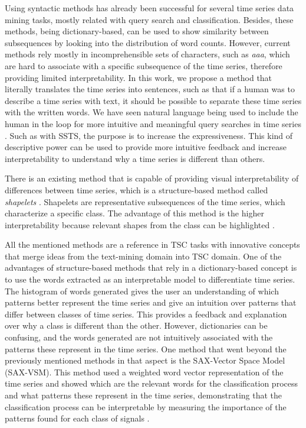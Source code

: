 Using syntactic methods has already been successful for several time series data mining tasks, mostly related with query search and classification. Besides, these methods, being dictionary-based, can be used to show similarity between subsequences by looking into the distribution of word counts. However, current methods rely mostly in incomprehensible sets of characters, such as \textit{aaa}, which are hard to associate with a specific subsequence of the time series, therefore providing limited interpretability. In this work, we propose a method that literally translates the time series into sentences, such as that if a human was to describe a time series with text, it should be possible to separate these time series with the written words. We have seen natural language being used to include the human in the loop for more intuitive and meaningful query searches in time series \cite{hil_naturallanguage}. Such as with SSTS, the purpose is to increase the expressiveness. This kind of descriptive power can be used to provide more intuitive feedback and increase interpretability to understand why a time series is different than others.
\par
There is an existing method that is capable of providing visual interpretability of differences between time series, which is a structure-based method called \textit{shapelets} \cite{shapelets}. Shapelets are representative subsequences of the time series, which characterize a specific class. The advantage of this method is the higher interpretability because relevant shapes from the class can be highlighted \cite{shapelets}. 
\par
All the mentioned methods are a reference in TSC tasks with innovative concepts that merge ideas from the text-mining domain into TSC domain. One of the advantages of structure-based methods that rely in a dictionary-based concept is to use the words extracted as an interpretable model to differentiate time series. The histogram of words generated gives the user an understanding of which patterns better represent the time series and give an intuition over patterns that differ between classes of time series. This provides a feedback and explanation over why a class is different than the other. However, dictionaries can be confusing, and the words generated are not intuitively associated with the patterns these represent in the time series. One method that went beyond the previously mentioned methods in that aspect is the SAX-Vector Space Model (SAX-VSM). This method used a weighted word vector representation of the time series and showed which are the relevant words for the classification process and what patterns these represent in the time series, demonstrating that the classification process can be interpretable by measuring the importance of the patterns found for each class of signals \cite{sax_vsm}. 
